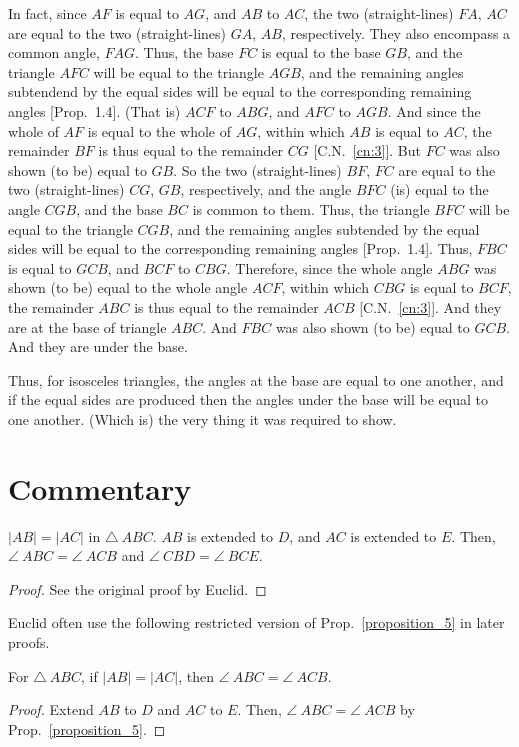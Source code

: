 In fact, since $AF$ is equal to $AG$, and $AB$ to $AC$, the two (straight-lines) $FA$, $AC$ are
equal to the two (straight-lines) $GA$, $AB$, respectively. They also encompass a
common angle, $FAG$. Thus, the base $FC$ is equal to the base $GB$, and the
triangle $AFC$ will be equal to the triangle $AGB$, and the remaining angles
subtendend by the equal sides will
be equal to the corresponding  remaining angles [Prop.~1.4].  (That is) $ACF$ to $ABG$, and $AFC$ to $AGB$. And since the whole of $AF$ is
equal to the whole of $AG$, within which $AB$ is equal to $AC$, the remainder
$BF$ is thus equal to the remainder $CG$ [C.N.~\ref{cn:3}]. But $FC$ was also shown (to be) equal to $GB$. So
the two (straight-lines) $BF$, $FC$ are equal to the two (straight-lines) $CG$, $GB$, respectively,
and the angle $BFC$ (is) equal to the angle $CGB$, and the base $BC$ is common to
them. Thus, the triangle $BFC$ will be equal to the triangle $CGB$, and
the remaining angles subtended by the equal sides will be equal to the corresponding remaining angles [Prop.~1.4]. Thus, $FBC$ is equal to $GCB$, and $BCF$ to
$CBG$. Therefore, since the whole angle $ABG$ was shown (to be) equal to the
whole angle $ACF$, within which $CBG$ is equal to $BCF$, the remainder $ABC$
is thus equal to the remainder $ACB$ [C.N.~\ref{cn:3}]. And they are at the base of triangle
$ABC$. And $FBC$ was also shown (to be) equal to $GCB$. And they are under
the base.

Thus, for isosceles triangles, the angles at the base are equal to one another, and if
the equal sides are produced then the angles under the base will be equal to one another. (Which is) the very thing it was required to show.



\section*{Commentary}

\begin{proposition}\label{proposition_5}\leanok
    $|AB| = |AC|$ in $\triangle~ABC$. $AB$ is extended to $D$, and $AC$ is extended to $E$. Then, $\angle~ABC = \angle~ACB$ and $\angle~CBD = \angle~BCE$.
\end{proposition}
\begin{proof}
    \leanok
    See the original proof by Euclid.
\end{proof}

Euclid often use the following restricted version of Prop.~\ref{proposition_5} in later proofs.

\begin{proposition}\label{proposition_5'}\leanok
    For $\triangle~ABC$, if $|AB| = |AC|$, then $\angle~ABC = \angle~ACB$.
\end{proposition}
\begin{proof}
    \leanok
    Extend $AB$ to $D$ and $AC$ to $E$. Then, $\angle~ABC = \angle~ACB$ by Prop.~\ref{proposition_5}.
\end{proof}